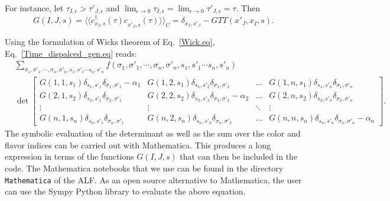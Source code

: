 For instance, let  $\tau_{I,\epsilon}   > \tau'_{J,\epsilon}  $  and $ \lim_{\epsilon \rightarrow 0 } \tau_{I,\epsilon}   = \lim_{\epsilon \rightarrow 0 }\tau'_{J,\epsilon} = \tau$. Then 
\begin{equation}
	G(I,J,s)   =  \langle \langle  c^{\dagger}_{x_I,s}(\tau) c^{\phantom\dagger}_{x'_{J},s}(\tau)  \rangle \rangle_{C}  =   \delta_{x_I,x'_J} -  GTT(x'_J,x_I,s).
\end{equation}

Using the formulation of Wicks theorem of Eq.~\ref{Wick.eq},  Eq.~\ref{Time_dispalced_gen.eq}  reads: 
\begin{align}
	& \sum_{\sigma_1, \sigma'_1, \cdots, \sigma_n, \sigma'_n,  s_1, s'_1  \cdots s_n,  s'_n  }  f( \sigma_1, \sigma'_1, \cdots, \sigma_n, \sigma'_n,  s_1, s'_1  \cdots s_n,  s'_n ) 
	\\
	& \det  
\begin{bmatrix}
   G(1,1,s_1) \delta_{s_1,s'_1} \delta_{\sigma_1,\sigma'_1} - \alpha_1 & 
   G(1,2,s_1) \delta_{s_1,s'_2} \delta_{\sigma_1,\sigma'_2}   \phantom{ - \alpha_1}         & \dots   &   
   G(1,n,s_1) \delta_{s_1,s'_n} \delta_{\sigma_1,\sigma'_n}   \phantom{ - \alpha_1} \\
   G(2,1,s_2) \delta_{s_2,s'_1} \delta_{\sigma_2,\sigma'_1}  \phantom{ - \alpha_1} &   
   G(2,2,s_2) \delta_{s_2,s'_2} \delta_{\sigma_2,\sigma'_2} - \alpha_2  & \dots  &
    G(2,n,s_2) \delta_{s_2,s'_n} \delta_{\sigma_2,\sigma'_n} \phantom{ - \alpha_2}  \\
    \vdots & \vdots &  \ddots & \vdots \\
    G(n,1,s_n) \delta_{s_n,s'_1} \delta_{\sigma_n,\sigma'_1}   \phantom{- \alpha_n} & 
    G(n,2,s_n) \delta_{s_n,s'_2} \delta_{\sigma_n,\sigma'_2}   \phantom{- \alpha_n} & \dots  & 
     G(n,n,s_n) \delta_{s_n,s'_n} \delta_{\sigma_n,\sigma'_n}   - \alpha_n  
 \end{bmatrix}.   \nonumber 
\end{align}
The  symbolic evaluation of the  determinant   as well as the sum over the color and flavor indices can be carried out with Mathematica.  This  produces a  long expression in terms of the   functions $G(I,J,s)$ that can then be  included in the code.   The Mathematica notebooks  that we use  can be found in the directory  \texttt{Mathematica}  of  the ALF.   As an open source alternative to Mathematica, the user can use the  Sympy  Python library   to  evaluate   the above equation. 


